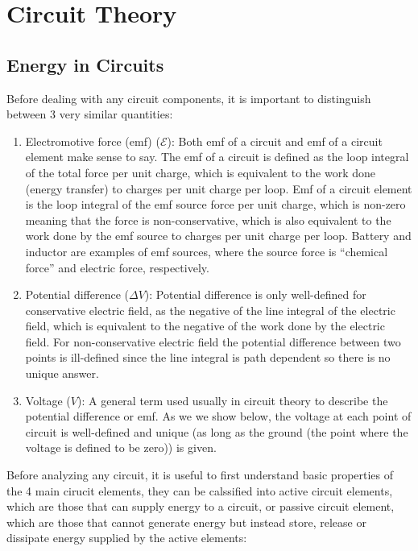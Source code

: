\documentclass[english,a4paper,12pt]{report}
\begin{document}

\chapter{Circuit Theory}

\section{Energy in Circuits}

Before dealing with any circuit components, it is important to distinguish between 3 very similar quantities:

\begin{enumerate}
    \item Electromotive force (emf) (\(\mathcal{E}\)): Both emf of a circuit and emf of a circuit element make sense to say. The emf of a circuit is defined as the loop integral of the total force per unit charge, which is equivalent to the work done (energy transfer) to charges per unit charge per loop. Emf of a circuit element is the loop integral of the emf source force per unit charge, which is non-zero meaning that the force is non-conservative, which is also equivalent to the work done by the emf source to charges per unit charge per loop. Battery and inductor are examples of emf sources, where the source force is ``chemical force'' and electric force, respectively.
    \item Potential difference (\(\Delta V\)): Potential difference is only well-defined for conservative electric field, as the negative of the line integral of the electric field, which is equivalent to the negative of the work done by the electric field. For non-conservative electric field the potential difference between two points is ill-defined since the line integral is path dependent so there is no unique answer. 
    \item Voltage (\(V\)): A general term used usually in circuit theory to describe the potential difference or emf. As we we show below, the voltage at each point of circuit is well-defined and unique (as long as the ground (the point where the voltage is defined to be zero)) is given.
\end{enumerate}


Before analyzing any circuit, it is useful to first understand basic properties of the 4 main cirucit elements, they can be calssified into active circuit elements, which are those that can supply energy to a circuit, or passive circuit element, which are those that cannot generate energy but instead store, release or dissipate energy supplied by the active elements:
\end{document}
